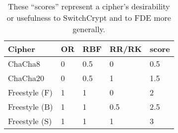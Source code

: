 \begin{table}[]
  \begin{tabular}{@{}lllll@{}}
  \toprule
  \textbf{Cipher} & \textbf{OR} & \textbf{RBF} & \textbf{RR/RK} & \textbf{score} \\ \midrule
  ChaCha8         & 0           & 0.5          & 0              & 0.5            \\
  ChaCha20        & 0           & 0.5          & 1              & 1.5            \\
  Freestyle (F)   & 1           & 1            & 0              & 2              \\
  Freestyle (B)   & 1           & 1            & 0.5            & 2.5            \\
  Freestyle (S)   & 1           & 1            & 1              & 3
  \end{tabular}
  \caption{These ``scores'' represent a cipher's desirability or usefulness to
  SwitchCrypt and to FDE more generally.}
  \label{tbl:security-quant}
\end{table}
